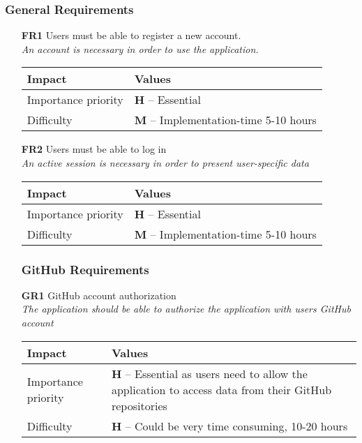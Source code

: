 \subsubsection{General Requirements}
\begin{itemize}
    \vspace{0.5cm}
	\item[\textbf{FR1}] Users must be able to register a new account. \\
        \textit{\small{An account is necessary in order to use the application. }}

        \begin{tabular}{| l | p{7cm} |}
            \hline
            \rowcolor[gray]{0.8}
            \textbf{Impact} & \textbf{Values} \\
            \hline
            Importance priority & \textbf{H} -- Essential \\
            Difficulty & \textbf{M} -- Implementation-time 5-10 hours\\
            \hline
        \end{tabular}
    \vspace{0.5cm}
    \item[\textbf{FR2}] Users must be able to log in \\
        \textit{\small{An active session is necessary in order to present user-specific data}}

        \begin{tabular}{| l | p{7cm} |}
            \hline
            \rowcolor[gray]{0.8}
            \textbf{Impact} & \textbf{Values} \\
            \hline
            Importance priority & \textbf{H} -- Essential \\
            Difficulty & \textbf{M} -- Implementation-time 5-10 hours \\
            \hline
        \end{tabular}
    \vspace{0.5cm}

    \subsubsection{GitHub Requirements}
    \item[\textbf{GR1}] GitHub account authorization\\
        \textit{\small{The application should be able to authorize the application with users GitHub account}}

        \begin{tabular}{| l | p{7cm} |}
            \hline
            \rowcolor[gray]{0.8}
            \textbf{Impact} & \textbf{Values} \\
            \hline
            Importance priority & \textbf{H} -- Essential as users need to allow the application to access data from their GitHub repositories\\
            Difficulty & \textbf{H} -- Could be very time consuming, 10-20 hours \\
            \hline
        \end{tabular}
    \vspace{0.5cm}


\end{itemize}
